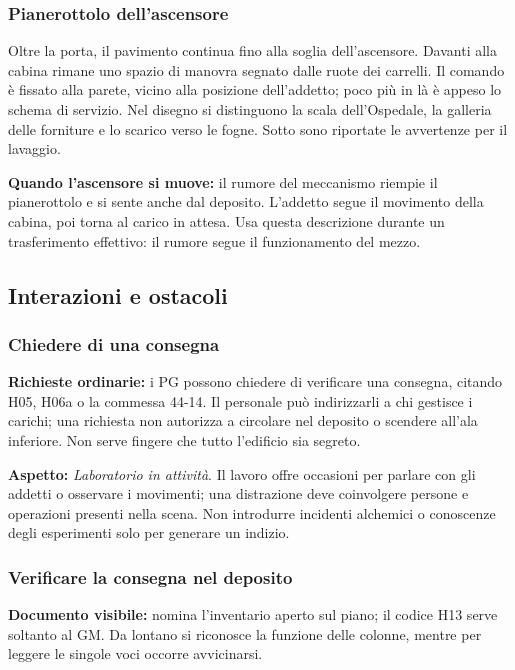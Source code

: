\documentclass[11pt,a4paper]{article}
\newcommand{\aspect}[1]{\textit{\textcolor{blood}{#1}}}
\begin{document}
\subsubsection{Pianerottolo dell'ascensore}
\begin{readaloud}
Oltre la porta, il pavimento continua fino alla soglia dell'ascensore. Davanti alla cabina rimane uno spazio di manovra segnato dalle ruote dei carrelli. Il comando è fissato alla parete, vicino alla posizione dell'addetto; poco più in là è appeso lo schema di servizio. Nel disegno si distinguono la scala dell'Ospedale, la galleria delle forniture e lo scarico verso le fogne. Sotto sono riportate le avvertenze per il lavaggio.
\end{readaloud}

\textbf{Quando l'ascensore si muove:} il rumore del meccanismo riempie il pianerottolo e si sente anche dal deposito. L'addetto segue il movimento della cabina, poi torna al carico in attesa. Usa questa descrizione durante un trasferimento effettivo: il rumore segue il funzionamento del mezzo.

\subsection{Interazioni e ostacoli}
\subsubsection{Chiedere di una consegna}
\textbf{Richieste ordinarie:} i PG possono chiedere di verificare una consegna, citando H05, H06a o la commessa 44-14. Il personale può indirizzarli a chi gestisce i carichi; una richiesta non autorizza a circolare nel deposito o scendere all'ala inferiore. Non serve fingere che tutto l'edificio sia segreto.

\textbf{Aspetto:} \aspect{Laboratorio in attività}. Il lavoro offre occasioni per parlare con gli addetti o osservare i movimenti; una distrazione deve coinvolgere persone e operazioni presenti nella scena. Non introdurre incidenti alchemici o conoscenze degli esperimenti solo per generare un indizio.

\subsubsection{Verificare la consegna nel deposito}
\textbf{Documento visibile:} nomina l'inventario aperto sul piano; il codice H13 serve soltanto al GM. Da lontano si riconosce la funzione delle colonne, mentre per leggere le singole voci occorre avvicinarsi.
\end{document}
